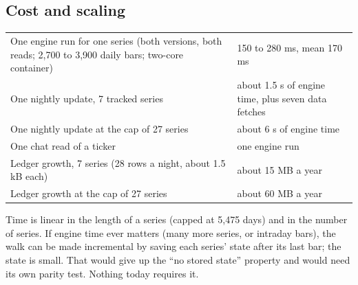 \documentclass[10.5pt]{article}
\begin{document}
\subsection*{Cost and scaling}
\begin{center}\small\begin{tabular}{@{}p{9.0cm}p{5.8cm}@{}}\toprule
One engine run for one series (both versions, both reads; 2,700 to 3,900 daily bars; two-core container) & 150 to 280 ms, mean 170 ms\\
One nightly update, 7 tracked series & about 1.5 s of engine time, plus seven data fetches\\
One nightly update at the cap of 27 series & about 6 s of engine time\\
One chat read of a ticker & one engine run\\
Ledger growth, 7 series (28 rows a night, about 1.5 kB each) & about 15 MB a year\\
Ledger growth at the cap of 27 series & about 60 MB a year\\\bottomrule\end{tabular}\end{center}
Time is linear in the length of a series (capped at 5,475 days) and in the number of series. If engine time ever matters (many more series, or intraday bars), the walk can be made incremental by saving each series' state after its last bar; the state is small. That would give up the ``no stored state'' property and would need its own parity test. Nothing today requires it.
\end{document}
